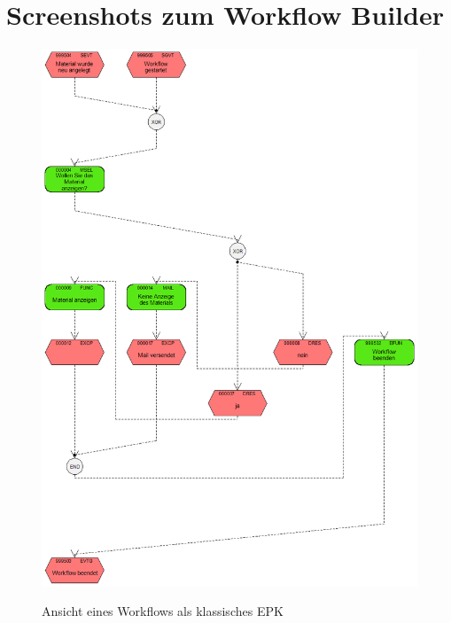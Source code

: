 \section{Screenshots zum Workflow Builder}
\vspace{-10pt} %
\begin{figure}[H]
	\begin{center}
	\includegraphics[height=0.9\textheight]{grafiken/wf-builder_view-classicepc.png}
	\caption{Ansicht eines Workflows als klassisches EPK}
	\vspace{-10pt}
	\label{abb:workflow-view-classicepc}
	\end{center}
\end{figure}

